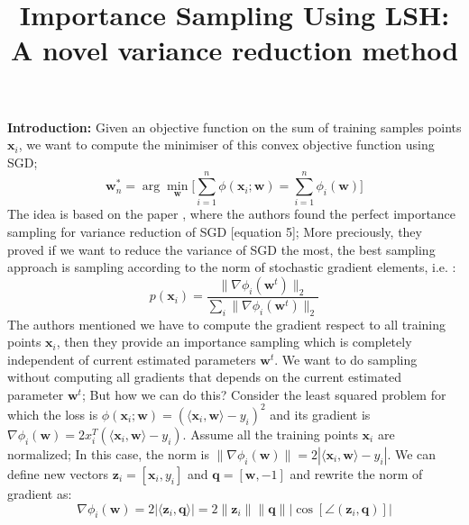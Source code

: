 \documentclass[11pt, a4paper, reqno, twoside]{scrartcl}
\theoremstyle{style}
\newcommand{\x}{\bm{x}}
\newcommand{\z}{\bm{z}}
\newcommand{\qv}{\bm{q}}
\newcommand{\wv}{\bm{w}}
\newcommand{\0}{\mathbf{0}} %
\begin{document}
\pagestyle{fancy}



\title{Importance Sampling Using LSH: A novel variance reduction method}

\date{} 

\maketitle


\textbf{Introduction:}
Given an objective function on the sum of training samples points $\x_i$, we
want to compute the minimiser of this convex objective function using SGD; 
\begin{equation*}
	\wv^*_n = \arg \min_{\wv} \bigg[ \sum_{i=1}^n \phi(\x_i;\wv) = \sum_{i=1}^n
	\phi_i(\wv) \bigg]
\end{equation*}
 The idea is based on the paper \cite{zhao2014stochastic}, where the
 authors found the perfect importance sampling for variance reduction of SGD
 [equation 5]; More preciously, they proved if we want to reduce the variance
 of SGD the most, the best sampling approach is sampling according to the norm
 of stochastic gradient elements, i.e. :
\begin{equation*}
	p(\x_i) = \frac{\|\nabla \phi_i(\wv^t)\|_2}{\sum_i \|\nabla \phi_i(\wv^t)\|_2}
\end{equation*}
The authors mentioned we have to compute the gradient respect to all training
points $\x_i$, then they provide an importance sampling which is completely
independent of current estimated parameters $\wv^t$. We want to do sampling without
computing all gradients that depends on the current estimated parameter $\wv^t$;
But how we can do this? Consider the least squared problem for which the loss is $\phi(\x_i;\wv) = (\langle \x_i, \wv \rangle -
y_i)^2 $ and its gradient is $\nabla \phi_i(\wv) = 2 x_i^T(\langle \x_i, \wv \rangle -
y_i)$. Assume all the training points $\x_i$ are normalized; In this case, the
norm is $\|\nabla \phi_i(\wv)\| = 2 |\langle \x_i, \wv \rangle -
y_i|$. We can define new vectors $\z_i = [\x_i,y_i]$ and $\qv = [\wv,-1]$ and
rewrite the norm of gradient as: 
\begin{equation*}
	\nabla \phi_i(\wv) = 2 |\langle \z_i, \qv \rangle| = 2 \|\z_i\| \|\qv\|
	|\cos[\angle(\z_i,\qv)]|
\end{equation*}
\end{document}
